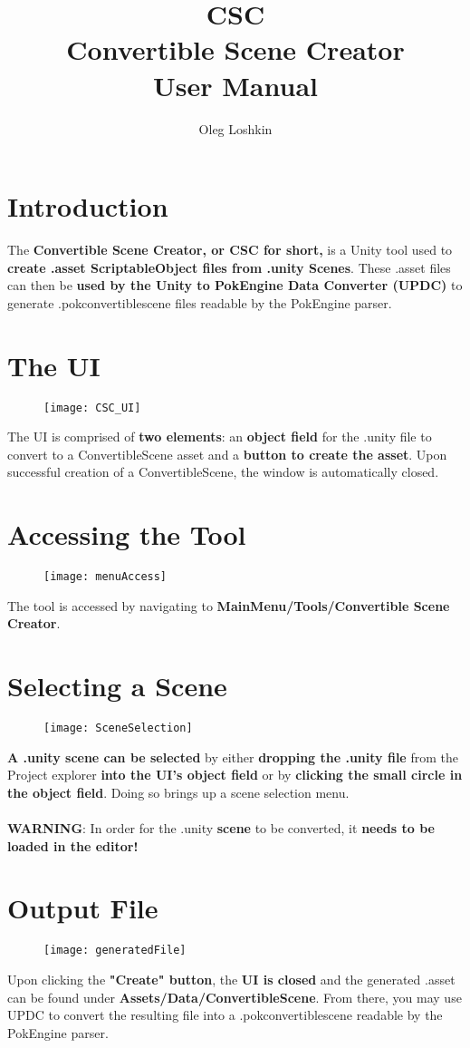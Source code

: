 \documentclass[10pt,a4paper]{article}
\author{Oleg Loshkin}
\title{\textbf{CSC}\\Convertible Scene Creator\\\textbf{User Manual}}
\begin{document}
\maketitle

\section{Introduction}
The \textbf{Convertible Scene Creator, or CSC for short,} is a Unity tool used to \textbf{create .asset ScriptableObject files from .unity Scenes}.
These .asset files can then be \textbf{used by the Unity to PokEngine Data Converter (UPDC)} to generate .pokconvertiblescene files readable by the PokEngine parser.

\section{The UI}
\begin{figure}[h]
\texttt{[image: CSC\_UI]}
\end{figure}
The UI is comprised of \textbf{two elements}: an \textbf{object field} for the .unity file to convert to a ConvertibleScene asset and a \textbf{button to create the asset}.
Upon successful creation of a ConvertibleScene, the window is automatically closed.
\newpage

\section{Accessing the Tool}
\begin{figure}[h]
\texttt{[image: menuAccess]}
\end{figure}The tool is accessed by navigating to \textbf{MainMenu/Tools/Convertible Scene Creator}.

\section{Selecting a Scene}
\begin{figure}[h]
\texttt{[image: SceneSelection]}
\end{figure}
\textbf{A .unity scene can be selected} by either \textbf{dropping the .unity file} from the Project explorer \textbf{into the UI's object field} or by \textbf{clicking the small circle in the object field}.
Doing so brings up a scene selection menu.\\\\
\textbf{WARNING}: In order for the .unity \textbf{scene} to be converted, it \textbf{needs to be loaded in the editor!}

\section{Output File}
\begin{figure}[h]
\texttt{[image: generatedFile]}
\end{figure}
Upon clicking the \textbf{"Create" button}, the \textbf{UI is closed} and the generated .asset can be found under\textbf{ Assets/Data/ConvertibleScene}.
From there, you may use UPDC to convert the resulting file into a .pokconvertiblescene readable by the PokEngine parser.
\end{document}
